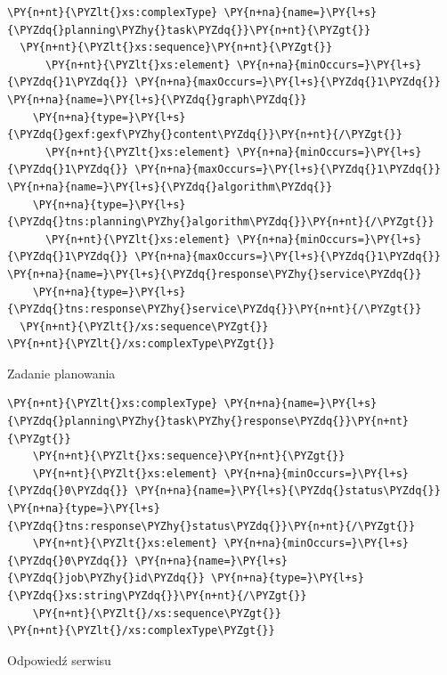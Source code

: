 \begin{program}
\begin{code}
\begin{Verbatim}[commandchars=\\\{\}]
\PY{n+nt}{\PYZlt{}xs:complexType} \PY{n+na}{name=}\PY{l+s}{\PYZdq{}planning\PYZhy{}task\PYZdq{}}\PY{n+nt}{\PYZgt{}}
  \PY{n+nt}{\PYZlt{}xs:sequence}\PY{n+nt}{\PYZgt{}}
      \PY{n+nt}{\PYZlt{}xs:element} \PY{n+na}{minOccurs=}\PY{l+s}{\PYZdq{}1\PYZdq{}} \PY{n+na}{maxOccurs=}\PY{l+s}{\PYZdq{}1\PYZdq{}} \PY{n+na}{name=}\PY{l+s}{\PYZdq{}graph\PYZdq{}} 
	\PY{n+na}{type=}\PY{l+s}{\PYZdq{}gexf:gexf\PYZhy{}content\PYZdq{}}\PY{n+nt}{/\PYZgt{}}
      \PY{n+nt}{\PYZlt{}xs:element} \PY{n+na}{minOccurs=}\PY{l+s}{\PYZdq{}1\PYZdq{}} \PY{n+na}{maxOccurs=}\PY{l+s}{\PYZdq{}1\PYZdq{}} \PY{n+na}{name=}\PY{l+s}{\PYZdq{}algorithm\PYZdq{}} 
	\PY{n+na}{type=}\PY{l+s}{\PYZdq{}tns:planning\PYZhy{}algorithm\PYZdq{}}\PY{n+nt}{/\PYZgt{}}
      \PY{n+nt}{\PYZlt{}xs:element} \PY{n+na}{minOccurs=}\PY{l+s}{\PYZdq{}1\PYZdq{}} \PY{n+na}{maxOccurs=}\PY{l+s}{\PYZdq{}1\PYZdq{}} \PY{n+na}{name=}\PY{l+s}{\PYZdq{}response\PYZhy{}service\PYZdq{}} 
	\PY{n+na}{type=}\PY{l+s}{\PYZdq{}tns:response\PYZhy{}service\PYZdq{}}\PY{n+nt}{/\PYZgt{}}
  \PY{n+nt}{\PYZlt{}/xs:sequence\PYZgt{}}
\PY{n+nt}{\PYZlt{}/xs:complexType\PYZgt{}}
\end{Verbatim}
\end{code}
\caption{Zadanie planowania}
\end{program}

\begin{program}
\begin{code}
\begin{Verbatim}[commandchars=\\\{\}]
\PY{n+nt}{\PYZlt{}xs:complexType} \PY{n+na}{name=}\PY{l+s}{\PYZdq{}planning\PYZhy{}task\PYZhy{}response\PYZdq{}}\PY{n+nt}{\PYZgt{}}
    \PY{n+nt}{\PYZlt{}xs:sequence}\PY{n+nt}{\PYZgt{}}
	\PY{n+nt}{\PYZlt{}xs:element} \PY{n+na}{minOccurs=}\PY{l+s}{\PYZdq{}0\PYZdq{}} \PY{n+na}{name=}\PY{l+s}{\PYZdq{}status\PYZdq{}} \PY{n+na}{type=}\PY{l+s}{\PYZdq{}tns:response\PYZhy{}status\PYZdq{}}\PY{n+nt}{/\PYZgt{}}
	\PY{n+nt}{\PYZlt{}xs:element} \PY{n+na}{minOccurs=}\PY{l+s}{\PYZdq{}0\PYZdq{}} \PY{n+na}{name=}\PY{l+s}{\PYZdq{}job\PYZhy{}id\PYZdq{}} \PY{n+na}{type=}\PY{l+s}{\PYZdq{}xs:string\PYZdq{}}\PY{n+nt}{/\PYZgt{}}
    \PY{n+nt}{\PYZlt{}/xs:sequence\PYZgt{}}
\PY{n+nt}{\PYZlt{}/xs:complexType\PYZgt{}}
\end{Verbatim}
\end{code}
\caption{Odpowiedź serwisu}
\end{program}

